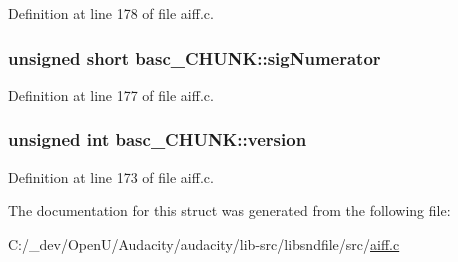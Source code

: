 Definition at line 178 of file aiff.\+c.

\subsubsection[{\texorpdfstring{sig\+Numerator}{sigNumerator}}]{\setlength{\rightskip}{0pt plus 5cm}unsigned short basc\+\_\+\+C\+H\+U\+N\+K\+::sig\+Numerator}\hypertarget{structbasc___c_h_u_n_k_a42b70974b20a502e483eb1a329650b2b}{}\label{structbasc___c_h_u_n_k_a42b70974b20a502e483eb1a329650b2b}


Definition at line 177 of file aiff.\+c.

\subsubsection[{\texorpdfstring{version}{version}}]{\setlength{\rightskip}{0pt plus 5cm}unsigned {\bf int} basc\+\_\+\+C\+H\+U\+N\+K\+::version}\hypertarget{structbasc___c_h_u_n_k_a700c7237df97d97b0702327ec6a1ce14}{}\label{structbasc___c_h_u_n_k_a700c7237df97d97b0702327ec6a1ce14}


Definition at line 173 of file aiff.\+c.



The documentation for this struct was generated from the following file\+:\begin{DoxyCompactItemize}
\item 
C\+:/\+\_\+dev/\+Open\+U/\+Audacity/audacity/lib-\/src/libsndfile/src/\hyperlink{aiff_8c}{aiff.\+c}\end{DoxyCompactItemize}
